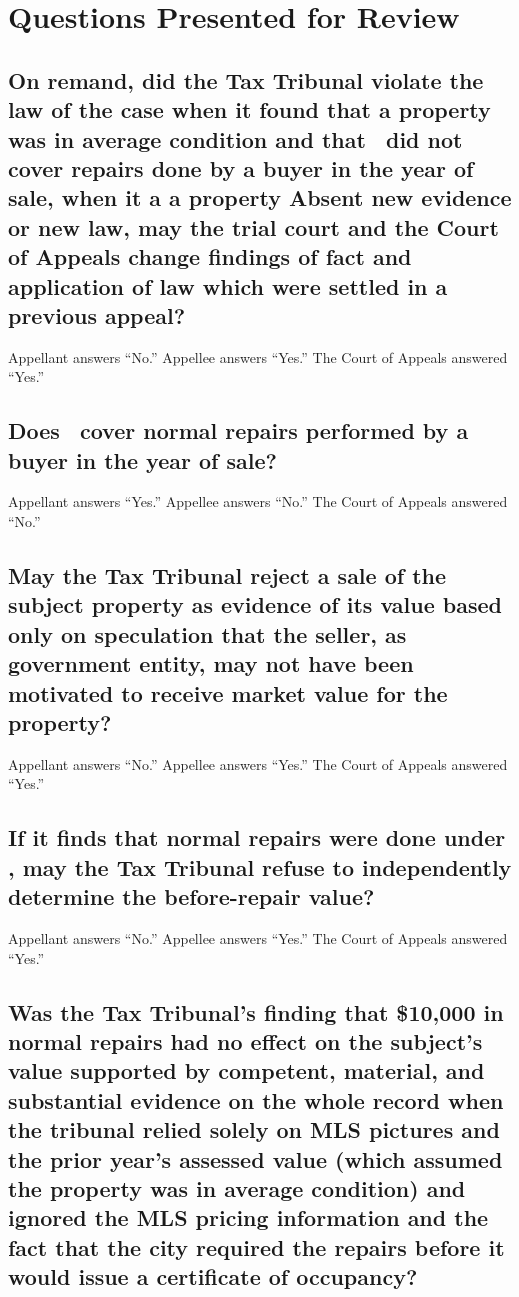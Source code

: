 \documentclass[12pt,\documentclassflag]{michiganCourtOfAppealsBrief}
\begin{document}
\newpage
\section{Questions Presented for Review}

\subsection{On remand, did the Tax Tribunal violate the law of the case
  when it found that a property was in average condition and
  that \mathieuGast\ did not cover repairs done by a buyer in the year of sale,
  when  it  a   a property  Absent new evidence or new law, may the trial court and the Court of Appeals change findings of fact and application of law which were settled in a previous appeal?}

\noindent Appellant answers ``No.'' Appellee answers ``Yes.'' The Court of Appeals answered ``Yes.''

\subsection{Does \mathieuGast\ cover normal repairs performed by a buyer in the year of sale?}

\noindent Appellant answers ``Yes.'' Appellee answers ``No.'' The Court of Appeals answered ``No.''

\subsection{May the Tax Tribunal reject a sale of the subject property as evidence of its value based only on speculation that the seller, as government entity, may not have been motivated to receive market value for the property?}

\noindent Appellant answers ``No.'' Appellee answers ``Yes.'' The Court of Appeals answered ``Yes.''

\subsection{If it finds that normal repairs were done under \mathieuGast, may the Tax Tribunal refuse to independently determine the before-repair value?}

\noindent Appellant answers ``No.'' Appellee answers ``Yes.'' The Court of Appeals answered ``Yes.''

\subsection{Was the Tax Tribunal's finding that \$10,000 in normal repairs had no effect on the subject's value supported by competent, material, and substantial evidence on the whole record when the tribunal relied solely on MLS pictures and the prior year's assessed value (which assumed the property was in average condition) and ignored the MLS pricing information and the fact that the city required the repairs before it would issue a certificate of occupancy?}
\end{document}
